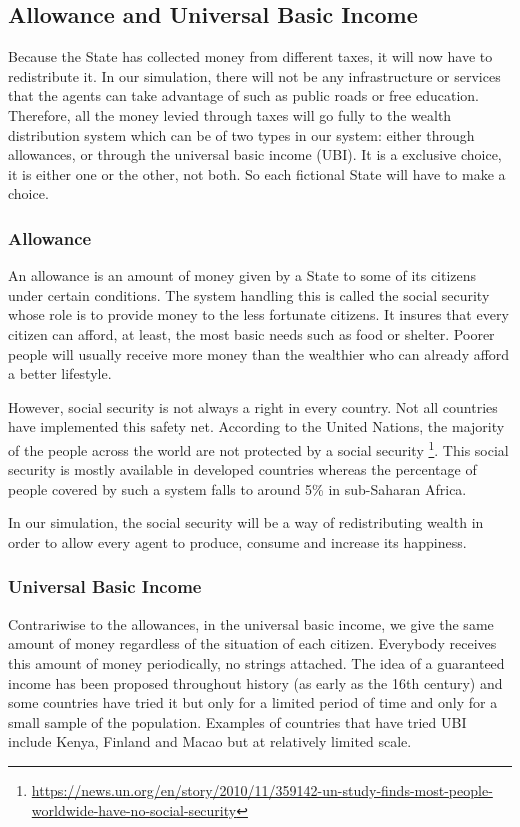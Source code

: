 \documentclass[12pt]{article}
\begin{document}
\subsection{Allowance and Universal Basic Income}

Because the State has collected money from different taxes, it will now have to redistribute it. In our simulation, there will not be any infrastructure or services that the agents can take advantage of such as public roads or free education. Therefore, all the money levied through taxes will go fully to the wealth distribution system which can be of two types in our system: either through allowances, or through the universal basic income (UBI). It is a exclusive choice, it is either one or the other, not both. So each fictional State will have to make a choice.

    \subsubsection{Allowance}
    
    An allowance is an amount of money given by a State to some of its citizens under certain conditions. The system handling this is called the social security whose role is to provide money to the less fortunate citizens. It insures that every citizen can afford, at least, the most basic needs such as food or shelter. Poorer people will usually receive more money than the wealthier who can already afford a better lifestyle.
    
    However, social security is not always a right in every country. Not all countries have implemented this safety net. According to the United Nations, the majority of the people across the world are not protected by a social security \footnote{\url{https://news.un.org/en/story/2010/11/359142-un-study-finds-most-people-worldwide-have-no-social-security}}. This social security is mostly available in developed countries whereas the percentage of people covered by such a system falls to around 5\% in sub-Saharan Africa.
    
    In our simulation, the social security will be a way of redistributing wealth in order to allow every agent to produce, consume and increase its happiness.
    
    \subsubsection{Universal Basic Income}
    
    Contrariwise to the allowances, in the universal basic income, we give the same amount of money regardless of the situation of each citizen. Everybody receives this amount of money periodically, no strings attached. The idea of a guaranteed income has been proposed throughout history (as early as the 16th century) and some countries have tried it but only for a limited period of time and only for a small sample of the population. Examples of countries that have tried UBI include Kenya, Finland and Macao but at relatively limited scale. 
    
\end{document}
